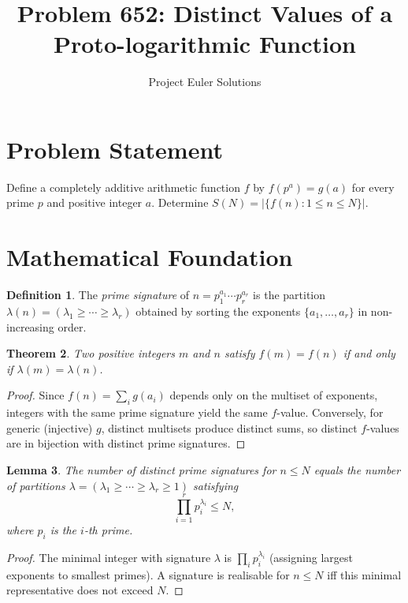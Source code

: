 \documentclass[11pt]{article}
\title{Problem 652: Distinct Values of a Proto-logarithmic Function}
\author{Project Euler Solutions}
\date{}
\newtheorem{theorem}{Theorem}
\newtheorem{lemma}[theorem]{Lemma}
\theoremstyle{definition}
\newtheorem{definition}[theorem]{Definition}
\begin{document}
\maketitle

\section{Problem Statement}

Define a completely additive arithmetic function $f$ by $f(p^a) = g(a)$ for every prime $p$ and positive integer $a$. Determine $S(N) = |\{f(n) : 1 \le n \le N\}|$.

\section{Mathematical Foundation}

\begin{definition}
The \emph{prime signature} of $n = p_1^{a_1}\cdots p_r^{a_r}$ is the partition $\lambda(n) = (\lambda_1 \ge \cdots \ge \lambda_r)$ obtained by sorting the exponents $\{a_1,\ldots,a_r\}$ in non-increasing order.
\end{definition}

\begin{theorem}
Two positive integers $m$ and $n$ satisfy $f(m)=f(n)$ if and only if $\lambda(m)=\lambda(n)$.
\end{theorem}

\begin{proof}
Since $f(n) = \sum_i g(a_i)$ depends only on the multiset of exponents, integers with the same prime signature yield the same $f$-value. Conversely, for generic (injective) $g$, distinct multisets produce distinct sums, so distinct $f$-values are in bijection with distinct prime signatures.
\end{proof}

\begin{lemma}
The number of distinct prime signatures for $n \le N$ equals the number of partitions $\lambda = (\lambda_1 \ge \cdots \ge \lambda_r \ge 1)$ satisfying
\[
\prod_{i=1}^{r} p_i^{\lambda_i} \le N,
\]
where $p_i$ is the $i$-th prime.
\end{lemma}

\begin{proof}
The minimal integer with signature $\lambda$ is $\prod_i p_i^{\lambda_i}$ (assigning largest exponents to smallest primes). A signature is realisable for $n \le N$ iff this minimal representative does not exceed $N$.
\end{proof}
\end{document}
